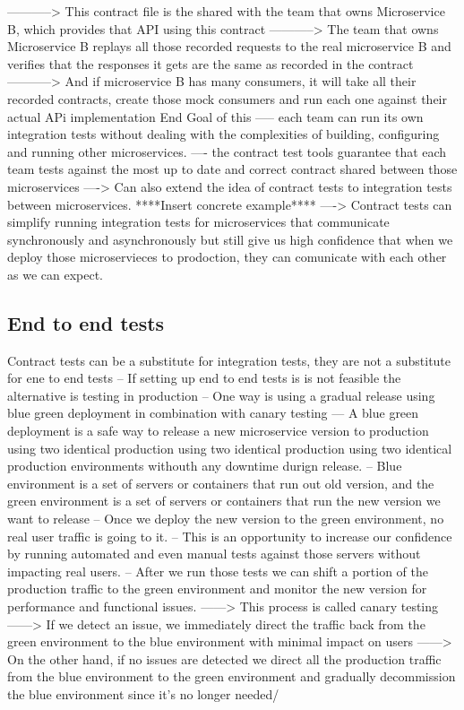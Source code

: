\documentclass[a4paper, 11pt]{book}
\begin{document}
{    -----------> This contract file is the shared with the team that owns Microservice B, which provides that API using this contract
    -----------> The team that owns Microservice B replays all those recorded requests to the real microservice B and verifies that the responses it gets are the same as recorded in the contract
    -----------> And if microservice B has many consumers, it will take all their recorded contracts, create those mock consumers and run each one against their actual APi implementation
    End Goal of this ----- each team can run its own integration tests without dealing with the complexities of building, configuring and running other microservices.
    ---- the contract test tools guarantee that each team tests against the most up to date and correct contract shared between those microservices
    ----> Can also extend the idea of contract tests to integration tests between microservices. ****Insert concrete example****
    ----> Contract tests can simplify running integration tests for microservices that communicate synchronously and asynchronously but still give us high confidence that when we deploy those microservieces to prodoction, they can comunicate with each other as we can expect.

    \subsection{End to end tests}
    Contract tests can be a substitute for integration tests, they are not a substitute for ene to end tests
    -- If setting up end to end tests is is not feasible the alternative is testing in production
    -- One way is using a gradual release using blue green deployment in combination with canary testing
    --- A blue green deployment is a safe way to release a new microservice version to production using two identical production using two identical production using two identical production environments withouth any downtime durign release.
    -- Blue environment is a set of servers or containers that run out old version, and the green environment is a set of servers or containers that run the new version we want to release
    -- Once we deploy the new version to the green environment, no real user traffic is going to it.
    -- This is an opportunity to increase our confidence by running automated and even manual tests against those servers without impacting real users.
    -- After we run those tests we can shift a portion of the production traffic to the green environment and monitor the new version for performance and functional issues.
    ------> This process is called canary testing
    ------> If we detect an issue, we immediately direct the traffic back from the green environment to the blue environment with minimal impact on users
    ------> On the other hand, if no issues are detected we direct all the production traffic from the blue environment to the green environment and gradually decommission the blue environment since it's no longer needed/

}
\end{document}
